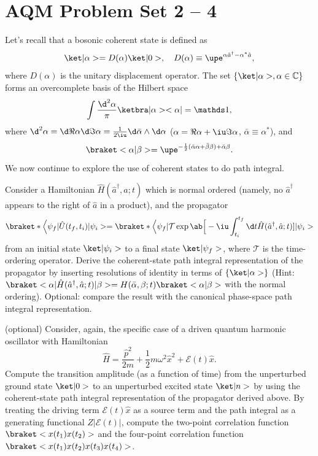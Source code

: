 
\section{AQM Problem Set 2 -- 4}

\begin{problem}
   Let's recall that a bosonic coherent state is defined as
  \[
    \ket|\alpha> = D(\alpha) \ket|0>, \quad
    D(\alpha) \equiv \upe^{\alpha\hat a^\dagger-\alpha^*\hat a},
  \]
  where $D(\alpha)$ is the unitary displacement operator. The
  set $\{\ket|\alpha>, \alpha \in \mathbb C\}$ forms an overcomplete basis of
  the Hilbert space
  \[
    \int \frac{\d^2\alpha}{\pi} \ketbra|\alpha><\alpha| = \identity,
  \]
  where $\d^2\alpha = \d\Re\alpha \d\Im\alpha
    = \frac{1}{2\iu}\d\bar\alpha \wedge \d\alpha$
  ($\alpha = \Re\alpha + \iu\Im\alpha$, $\bar\alpha \equiv \alpha^*$), and
  \[
    \braket<\alpha|\beta>
  = \upe^{-\frac12(\bar\alpha \alpha+\bar\beta\beta) + \bar\alpha \beta}.
  \]
  We now continue to explore the use of coherent states to do path integral.
  \begin{enumext*}[label = (\alph*)]
    \item Consider a Hamiltonian $\hat H(\hat a^\dagger, \hat a; t)$ which is
    normal ordered (namely, no $\hat a^\dagger$ appears to the right of $\hat a$
    in a product), and the propagator
    \[
      \braket*\Big<\psi_f|\hat U(t_f, t_i)|\psi_i>
    = \braket*\Big<\psi_f|\mathcal T \exp\ab\Big[
        -\iu\int_{t_i}^{t_f} \d t \hat H(\hat a^\dagger, \hat a; t)]|\psi_i>
    \]
    from an initial state $\ket|\psi_i>$ to a final state $\ket|\psi_f>$, where
    $\mathcal T$ is the time-ordering operator. Derive the coherent-state path
    integral representation of the propagator by inserting resolutions of
    identity in terms of $\{\ket|\alpha>\}$
    (Hint: $\braket<\alpha|\hat H(\hat a^\dagger, \hat a; t)|\beta>
      = H(\bar\alpha, \beta; t)\braket<\alpha|\beta>$ with the normal ordering).
    Optional: compare the result with the canonical phase-space path
    integral representation.
    \item* (optional) Consider, again, the specific case of a driven
    quantum harmonic oscillator with Hamiltonian
    \[
      \hat H = \frac{\hat p^2}{2m} + \frac12 m\omega^2 \hat x^2
             + \mathcal E(t) \hat x.
    \]
    Compute the transition amplitude (as a function of time) from the
    unperturbed ground state $\ket|0>$ to an unperturbed excited state
    $\ket|n>$ by using the coherent-state path integral representation of the
    propagator derived above. By treating the driving
    term $\mathcal E(t) \hat x$ as a source term and the path integral as a
    generating functional $Z|\mathcal E(t)|$, compute the two-point correlation
    function $\braket<x(t_1)x(t_2)>$ and the four-point correlation function
    $\braket<x(t_1)x(t_2)x(t_3)x(t_4)>$.
  \end{enumext*}
\end{problem}
